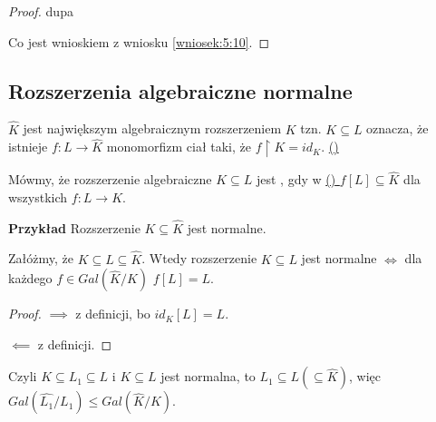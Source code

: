 \begin{proof}{\color{pagColor}dupa}

\begin{center}
\end{center}

Co jest wnioskiem z wniosku \ref{wniosek:5:10}.
\end{proof}

\subsection{Rozszerzenia algebraiczne normalne}

\label{aaaa}
$\hat{K}$ jest największym algebraicznym rozszerzeniem $K$ tzn. $K\subseteq L$ oznacza, że istnieje $f:L\to\hat{K}$ monomorfizm ciał taki, że $f\restriction K=id_K$. \hyperref[aaaa]{{\color{yellow}(\Coffeecup)}}
\medskip

Mówmy, że rozszerzenie algebraiczne $K\subseteq L$ jest , gdy w \hyperref[aaaa]{{\color{yellow}(\Coffeecup)} }$f[L]\subseteq\hat{K}$ dla wszystkich $f:L\to K$.

\textbf{Przykład} Rozszerzenie $K\subseteq\hat{K}$ jest normalne.

\begin{remark}\label{uwaga:6:2}
Załóżmy, że $K\subseteq L\subseteq\hat{K}$. Wtedy rozszerzenie $K\subseteq L$ jest normalne $\iff$ dla każdego $f\in Gal(\hat{K}/K)$ $f[L]=L$.
\end{remark}

\begin{proof}
$\implies$ z definicji, bo $id_K[L]=L$.

$\impliedby$ z definicji.

\end{proof}

Czyli $K\subseteq L_1\subseteq L$ i $K\subseteq L$ jest normalna, to $L_1\subseteq L(\subseteq \hat{K})$, więc $Gal(\hat{L_1}/L_1)\leq Gal(\hat{K}/K)$.


